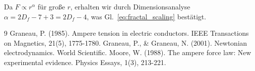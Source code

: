 	Da $F \propto r^{\alpha}$ für große $r$, erhalten wir durch Dimensionsanalyse $\alpha = 2D_f - 7 + 3 = 2D_f - 4$, was Gl.~\ref{eq:fractal_scaling} bestätigt.
	
	\begin{thebibliography}{9}
		 Graneau, P. (1985). Ampere tension in electric conductors. IEEE Transactions on Magnetics, 21(5), 1775-1780.
		 Graneau, P., \& Graneau, N. (2001). Newtonian electrodynamics. World Scientific.
		 Moore, W. (1988). The ampere force law: New experimental evidence. Physics Essays, 1(3), 213-221.
	\end{thebibliography}
	
